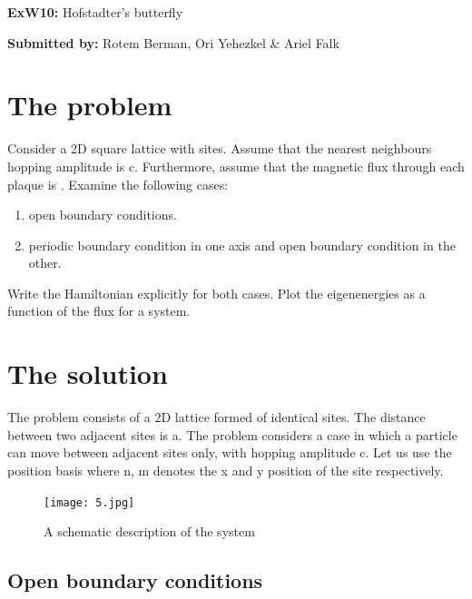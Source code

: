 \documentclass[11pt,fleqn]{article}
\newcommand{\exnumber}[1]{\newcommand{\exnum}{#1}}
\newcommand{\heading}[1]{\begin{center} {\Large {\bf Ex\exnum:} #1} \end{center}}
\newcommand{\auname}[1]{\begin{center} {\bf Submitted by:} #1 \end{center}}
\begin{document}
 
\exnumber{W10}
\heading{Hofstadter's butterfly}
\auname{Rotem Berman, Ori Yehezkel \& Ariel Falk }
\date{January 2020}
\graphicspath{{Images/}}
\setlength{\parindent}{0pt}

\section{The problem}
Consider a 2D square lattice with \endmath \space sites. Assume that the nearest neighbours hopping amplitude is c. Furthermore, assume that the magnetic flux through each plaque is \math{\Phi}. \endmath
\newline
\newline
Examine the following cases:
\begin{enumerate}
\item open boundary conditions.
\item periodic boundary condition in one axis and open boundary condition in the other.
\end{enumerate}
Write the Hamiltonian explicitly for both cases. Plot the eigenenergies as a function of the flux for a \endmath \space system. 




\section{The solution}


The problem consists of a 2D lattice formed of identical sites. The distance between two adjacent sites is a. The problem considers a case in which a particle can move between adjacent sites only, with hopping amplitude c. Let us use the position basis \endmath \space where n, m denotes the x and y position of the site respectively. 
 
\begin{figure}[htp!]
\centerline
    {\texttt{[image: 5.jpg]}}
    \caption{A schematic description of the system}
\end{figure}


\subsection{Open boundary conditions}
\end{document}

